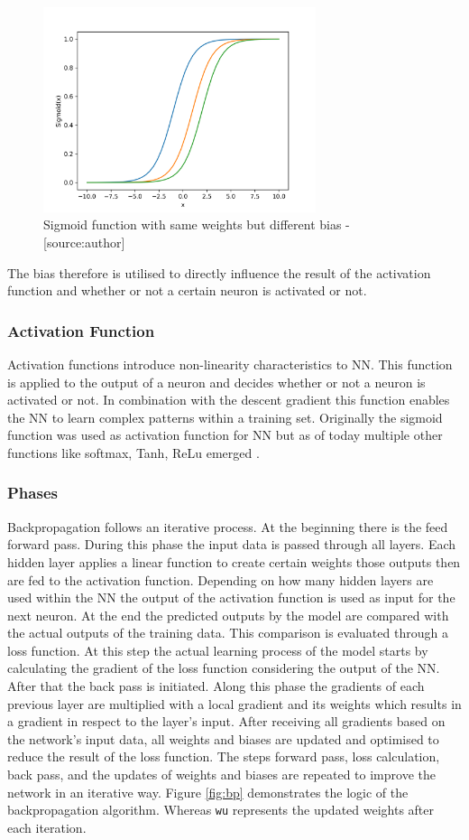 \begin{figure}[H]
	\centering
		\includegraphics[width=8cm]{images/bias}
	\caption{Sigmoid function with same weights but different bias - [source:author]}
	\label{fig:sig_w_bias}
\end{figure}
The bias therefore is utilised to directly influence the result of the activation function and whether or not a certain neuron is activated or not. 
\subsubsection{Activation Function}
Activation functions introduce non-linearity characteristics to NN. This function is applied to the output of a neuron and decides whether or not a neuron is activated or not.\cite{activation} In combination with the descent gradient this function enables the NN to learn complex patterns within a training set. Originally the sigmoid function \cite{bp_basic} was used as activation function for NN but as of today multiple other functions like softmax, Tanh, ReLu emerged \cite{activation}.

\subsubsection{Phases} 
 Backpropagation follows an iterative process. At the beginning there is the feed forward pass. During this phase the input data is passed through all layers. Each hidden layer applies a linear function to create certain weights those outputs then are fed to the activation function. Depending on how many hidden layers are used within the NN the output of the activation function is used as input for the next neuron. At the end the predicted outputs by the model are compared with the actual outputs of the training data. This comparison is evaluated through a loss function. At this step the actual learning process of the model starts by calculating the gradient of the loss function considering the output of the NN. After that the back pass is initiated. Along this phase the gradients of each previous layer are multiplied with a local gradient and its weights which results in a gradient in respect to the layer's input. After receiving all gradients  based on the network's input data, all weights and biases are updated and optimised to reduce the result of the loss function. The steps forward pass, loss calculation, back pass, and the updates of weights and biases are repeated to improve the network in an iterative way. \cite{bp_basic} Figure \ref{fig:bp} demonstrates the logic of the backpropagation algorithm. Whereas \verb|wu| represents the updated weights after each iteration.  

